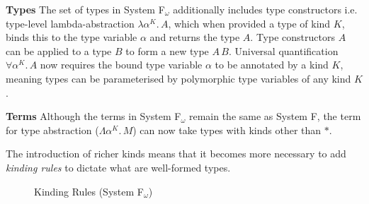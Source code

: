 \documentclass[acmsmall, 9pt]{article}
\begin{document}
\noindent
\textbf{Types} The set of types in System F$_\omega$ additionally includes type constructors i.e. type-level lambda-abstraction $\lambda \alpha^K. \, A$, which when provided a type of kind $K$, binds this to the type variable $\alpha$ and returns the type $A$. Type constructors $A$ can be applied to a type $B$ to form a new type $A\, B$. Universal quantification $\forall \alpha^K . \, A$ now requires the bound type variable $\alpha$ to be annotated by a kind $K$, meaning types can be parameterised by polymorphic type variables of any kind $K$.



\noindent
\textbf{Terms} Although the terms in System F$_\omega$ remain the same as System F, the term for type abstraction ($\Lambda \alpha^K . \, M$) can now take types with kinds other than $*$.

\lbreak
The introduction of richer kinds means that it becomes more necessary to add \textit{kinding rules} to dictate what are well-formed types.

\begin{figure}[H]
\flushleft {}
\caption{Kinding Rules (System F$_\omega$)}
\end{figure}
\end{document}
